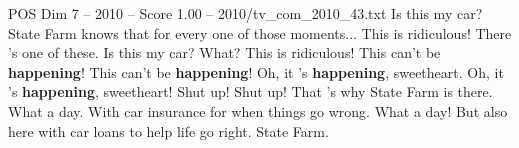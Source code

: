 \begin{textsample}{POS Dim 7 – 2010 – Score 1.00 – 2010/tv\_com\_2010\_43.txt}  \label{ex:f7_pos_076}
Is this my car?
State Farm knows that for every one of those moments...
This is ridiculous!
There 's one of these.
Is this my car?
What?
This is ridiculous!
This can't be \textbf{happening}!
This can't be \textbf{happening}!
Oh, it 's \textbf{happening}, sweetheart.
Oh, it 's \textbf{happening}, sweetheart!
Shut up!
Shut up!
That 's why State Farm is there.
What a day.
With car insurance for when things go wrong.
What a day!
But also here with car loans to help life go right.
State Farm.

\end{textsample}
